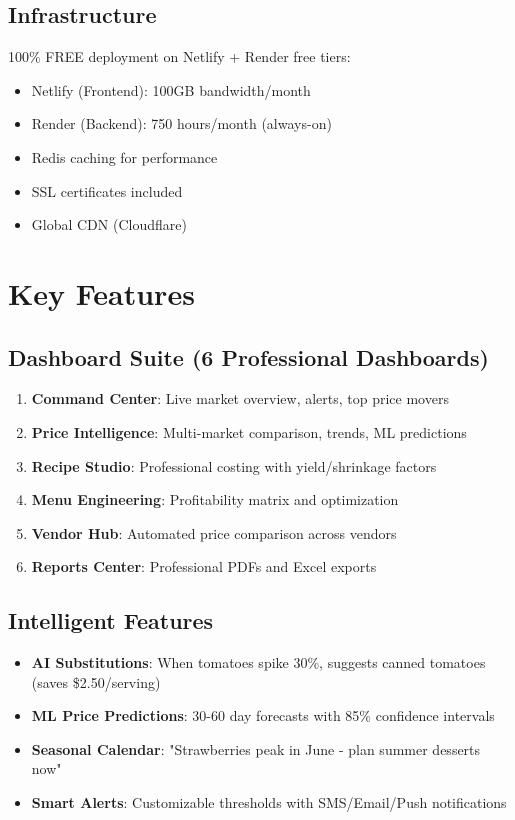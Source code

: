 \documentclass[11pt,a4paper]{article}
\begin{document}
\subsection{Infrastructure}
100\% FREE deployment on Netlify + Render free tiers:
\begin{itemize}
    \item Netlify (Frontend): 100GB bandwidth/month
    \item Render (Backend): 750 hours/month (always-on)
    \item Redis caching for performance
    \item SSL certificates included
    \item Global CDN (Cloudflare)
\end{itemize}

\section{Key Features}

\subsection{Dashboard Suite (6 Professional Dashboards)}
\begin{enumerate}
    \item \textbf{Command Center}: Live market overview, alerts, top price movers
    \item \textbf{Price Intelligence}: Multi-market comparison, trends, ML predictions
    \item \textbf{Recipe Studio}: Professional costing with yield/shrinkage factors
    \item \textbf{Menu Engineering}: Profitability matrix and optimization
    \item \textbf{Vendor Hub}: Automated price comparison across vendors
    \item \textbf{Reports Center}: Professional PDFs and Excel exports
\end{enumerate}

\subsection{Intelligent Features}
\begin{itemize}
    \item \textbf{AI Substitutions}: When tomatoes spike 30\%, suggests canned tomatoes (saves \$2.50/serving)
    \item \textbf{ML Price Predictions}: 30-60 day forecasts with 85\% confidence intervals
    \item \textbf{Seasonal Calendar}: "Strawberries peak in June - plan summer desserts now"
    \item \textbf{Smart Alerts}: Customizable thresholds with SMS/Email/Push notifications
\end{itemize}
\end{document}
